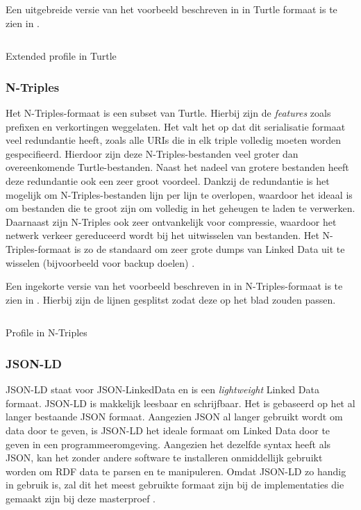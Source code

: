 Een uitgebreide versie van het voorbeeld beschreven in  in Turtle formaat is te zien in .

\begin{listing}[ht]
    \inputminted{turtle}{data/profile.ttl}
    \caption{Extended profile in Turtle}
    \label{listing:profile_turtle}
\end{listing}

\subsubsection{N-Triples}
Het N-Triples-formaat is een subset van Turtle. Hierbij zijn de \textit{features} zoals prefixen en verkortingen weggelaten. Het valt het op dat dit serialisatie formaat veel redundantie heeft, zoals alle URIs die in elk triple volledig moeten worden gespecifieerd. Hierdoor zijn deze N-Triples-bestanden veel groter dan overeenkomende Turtle-bestanden. Naast het nadeel van grotere bestanden heeft deze redundantie ook een zeer groot voordeel. Dankzij de redundantie is het mogelijk om N-Triples-bestanden lijn per lijn te overlopen, waardoor het ideaal is om bestanden die te groot zijn om volledig in het geheugen te laden te verwerken. Daarnaast zijn N-Triples ook zeer ontvankelijk voor compressie, waardoor het netwerk verkeer gereduceerd wordt bij het uitwisselen van bestanden. Het N-Triples-formaat is zo de standaard om zeer grote dumps van Linked Data uit te wisselen (bijvoorbeeld voor backup doelen) \cite{beckett2014rdfntriples}.

Een ingekorte versie van het voorbeeld beschreven in  in N-Triples-formaat is te zien in . Hierbij zijn de lijnen gesplitst zodat deze op het blad zouden passen.

\begin{listing}[ht]
    \inputminted{turtle}{data/profile_short.nt}
    \caption{Profile in N-Triples}
    \label{listing:profile_ntriples}
\end{listing}


\subsubsection{JSON-LD}
JSON-LD staat voor JSON-LinkedData en is een \textit{lightweight} Linked Data formaat. JSON-LD is makkelijk leesbaar en schrijfbaar. Het is gebaseerd op het al langer bestaande JSON formaat. Aangezien JSON al langer gebruikt wordt om data door te geven, is JSON-LD het ideale formaat om Linked Data door te geven in een programmeeromgeving. Aangezien het dezelfde syntax heeft als JSON, kan het zonder andere software te installeren onmiddellijk gebruikt worden om RDF data te parsen en te manipuleren. Omdat JSON-LD zo handig in gebruik is, zal dit het meest gebruikte formaat zijn bij de implementaties die gemaakt zijn bij deze masterproef \cite{sporny2012json}.

